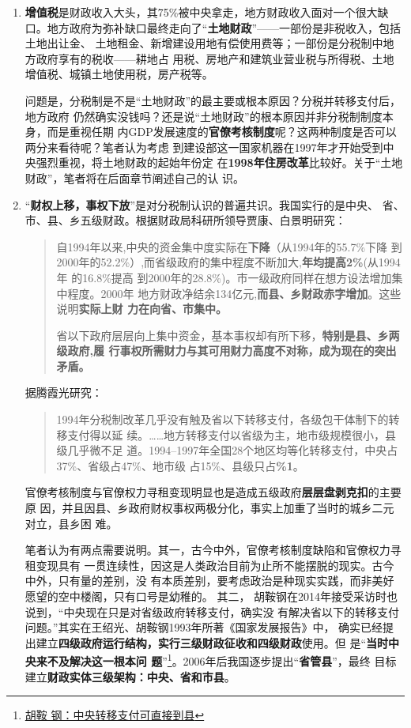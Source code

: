 \begin{enumerate}
\item \textbf{增值税}是财政收入大头，其75\%被中央拿走，地方财政收入面对一个很大缺
  口。地方政府为弥补缺口最终走向了“\textbf{土地财政}”——一部份是非税收入，包括土地出让金、
  土地租金、新增建设用地有偿使用费等；一部份是分税制中地方政府享有的税收——耕地占
  用税、房地产和建筑业营业税与所得税、土地增值税、城镇土地使用税，房产税等。

  问题是，分税制是不是“土地财政”的最主要或根本原因？分税并转移支付后，地方政府
  仍然确实没钱吗？还是说“土地财政”的根本原因并非分税制制度本身，而是重视任期
  内GDP发展速度的\textbf{官僚考核制度}呢？这两种制度是否可以两分来看待呢？笔者认为考虑
  到建设部这一国家机器在1997年才开始受到中央强烈重视，将土地财政的起始年份定
  在\textbf{1998年住房改革}比较好。关于“土地财政”，笔者将在后面章节阐述自己的认
  识。

\item “\textbf{财权上移，事权下放}”是对分税制认识的普遍共识。我国实行的是中央、
  省、市、县、乡五级财政。根据财政局科研所领导贾康、白景明研究：
  \begin{quotation}
    自1994年以来,中央的资金集中度实际在\textbf{下降}（从1994年的55.7\%下降
    到2000年的52.2\%）,而省级政府的集中程度不断加大,\textbf{年均提高2\%}(从1994年
    的16.8\%提高 到2000年的28.8\%)。市一级政府同样在想方设法增加集中程度。2000年
    地方财政净结余134亿元,\textbf{而县、乡财政赤字增加}。这些说明\textbf{实际上财
      力在向省、市集中。}\cite{xianxiangfenshui}

    省以下政府层层向上集中资金，基本事权却有所下移，\textbf{特别是县、乡两级政府,履
      行事权所需财力与其可用财力高度不对称，成为现在的突出矛盾。}
  \end{quotation}

  据腾霞光研究：
  \begin{quotation}
    1994年分税制改革几乎没有触及省以下转移支付，各级包干体制下的转移支付得以延
    续。……地方转移支付以省级为主，地市级规模很小，县级几乎微不足
    道。1994--1997年全国28个地区均等化转移支付，中央占37\%、省级占47\%、地市级
    占15\%、县级只占\textbf{\%1}。
  \end{quotation}

  官僚考核制度与官僚权力寻租变现明显也是造成五级政府\textbf{层层盘剥克扣}的主要原
  因，并且因县、乡政府财权事权两极分化，事实上加重了当时的城乡二元对立，县乡困
  难。

  笔者认为有两点需要说明。其一，古今中外，官僚考核制度缺陷和官僚权力寻租变现具有
  一贯连续性，因这是人类政治目前为止所不能摆脱的现实。古今中外，只有量的差别，没
  有本质差别，要考虑政治是种现实实践，而非美好愿望的空中楼阁，只有口号是幼稚的。
  其二， 胡鞍钢在2014年接受采访时也说到，“中央现在只是对省级政府转移支付，确实没
  有解决省以下的转移支付问题。”其实在王绍光、胡鞍钢1993年所著《国家发展报告》中，
  确实已经提出建立\textbf{四级政府运行结构，实行三级财政征收和四级财政}使用。但
  是“\textbf{当时中央来不及解决这一根本问
    题}”\footnote{\href{http://business.sohu.com/20140428/n398892838.shtml}{胡鞍
      钢：中央转移支付可直接到县}}。2006年后我国逐步提出“\textbf{省管县}”，最终
  目标建立\textbf{财政实体三级架构：中央、省和市县}。


\end{enumerate}
